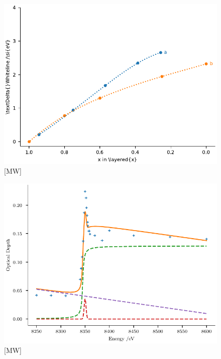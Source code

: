 \documentclass{article}
\begin{document}
\begin{figure}
  \includegraphics{figures/bulk-xas-extraction.pdf}
  \caption{[MW] }
  \label{fig:bulk-xas-extraction}
\end{figure}

\begin{figure}
  \includegraphics{figures/kedge-decomposition.pdf}
  \caption{[MW] }
  \label{fig:kedge-decomposition}
\end{figure}
\end{document}
